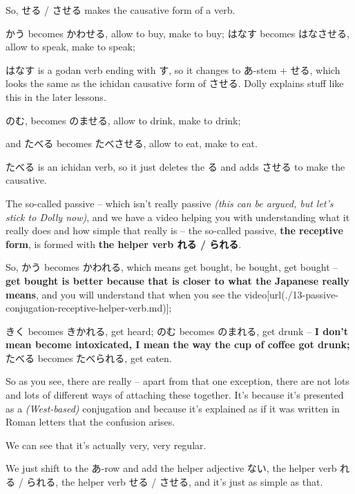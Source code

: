 So, せる / させる makes the causative form of a verb.

かう becomes かわせる, allow to buy, make to buy;\crlf
はなす becomes はなさせる, allow to speak, make to speak;

はなす is a godan verb ending with す, so it changes to あ-stem + せる, which looks the same as the ichidan causative form of させる. Dolly explains stuff like this in the later lessons.

のむ, becomes のませる, allow to drink, make to drink;

and たべる becomes たべさせる, allow to eat, make to eat.

たべる is an ichidan verb, so it just deletes the る and adds させる to make the causative.

\stopsectionlevel

\startsectionlevel[title={The receptive / passive},reference={the-receptive-passive}]

The so-called passive -- which isn't really passive {\em (this can be argued, but let's stick to Dolly now)}, and we have a video helping you with understanding what it really does and how simple that really is -- the so-called passive, {\bf the receptive form}, is formed with {\bf the helper verb れる / られる}.

So, かう becomes かわれる, which means get bought, be bought, get bought -- {\bf get bought is better because that is closer to what the Japanese really means}, and you will understand that when you see the video\goto{{[}13{]}}[url(./13-passive-conjugation-receptive-helper-verb.md)];

きく becomes きかれる, get heard; のむ becomes のまれる, get drunk -- {\bf I don't mean become intoxicated, I mean the way the cup of coffee got drunk;} たべる becomes たべられる, get eaten.

\thinrule

So as you see, there are really -- apart from that one exception, there are not lots and lots of different ways of attaching these together. It's because it's presented as a {\em (West-based)} conjugation and because it's explained as if it was written in Roman letters that the confusion arises.

We can see that it's actually very, very regular.

We just shift to the あ-row and add the helper adjective ない, the helper verb れる / られる, the helper verb せる / させる, and it's just as simple as that.

\stopsectionlevel

